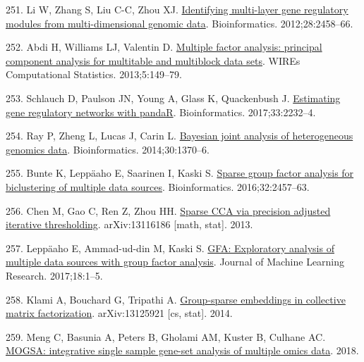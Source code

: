 \documentclass[
  12pt,
  a4paper,
  twoside,
  openright]{book}
\newlength{\cslhangindent}
\newlength{\cslentryspacingunit} %
\newenvironment{CSLReferences}[2] %
 {%
  \setlength{\parindent}{0pt}
  \ifodd #1
  \let\oldpar\par
  \def\par{\hangindent=\cslhangindent\oldpar}
  \fi
  \setlength{\parskip}{#2\cslentryspacingunit}
 }%
 {}
\begin{document}
\begin{CSLReferences}{0}{0}
\leavevmode{}%
251. Li W, Zhang S, Liu C-C, Zhou XJ. \href{https://doi.org/10.1093/bioinformatics/bts476}{Identifying multi-layer gene regulatory modules from multi-dimensional genomic data}. Bioinformatics. 2012;28:2458--66.

\leavevmode{}%
252. Abdi H, Williams LJ, Valentin D. \href{https://doi.org/10.1002/wics.1246}{Multiple factor analysis: principal component analysis for multitable and multiblock data sets}. WIREs Computational Statistics. 2013;5:149--79.

\leavevmode{}%
253. Schlauch D, Paulson JN, Young A, Glass K, Quackenbush J. \href{https://doi.org/10.1093/bioinformatics/btx139}{Estimating gene regulatory networks with pandaR}. Bioinformatics. 2017;33:2232--4.

\leavevmode{}%
254. Ray P, Zheng L, Lucas J, Carin L. \href{https://doi.org/10.1093/bioinformatics/btu064}{Bayesian joint analysis of heterogeneous genomics data}. Bioinformatics. 2014;30:1370--6.

\leavevmode{}%
255. Bunte K, Leppäaho E, Saarinen I, Kaski S. \href{https://doi.org/10.1093/bioinformatics/btw207}{Sparse group factor analysis for biclustering of multiple data sources}. Bioinformatics. 2016;32:2457--63.

\leavevmode{}%
256. Chen M, Gao C, Ren Z, Zhou HH. \href{http://arxiv.org/abs/1311.6186}{Sparse CCA via precision adjusted iterative thresholding}. arXiv:13116186 {[}math, stat{]}. 2013.

\leavevmode{}%
257. Leppäaho E, Ammad-ud-din M, Kaski S. \href{http://jmlr.org/papers/v18/16-509.html}{GFA: Exploratory analysis of multiple data sources with group factor analysis}. Journal of Machine Learning Research. 2017;18:1--5.

\leavevmode{}%
258. Klami A, Bouchard G, Tripathi A. \href{http://arxiv.org/abs/1312.5921}{Group-sparse embeddings in collective matrix factorization}. arXiv:13125921 {[}cs, stat{]}. 2014.

\leavevmode{}%
259. Meng C, Basunia A, Peters B, Gholami AM, Kuster B, Culhane AC. \href{https://www.biorxiv.org/content/10.1101/046904v2}{MOGSA: integrative single sample gene-set analysis of multiple omics data}. 2018.


\end{CSLReferences}
\end{document}
